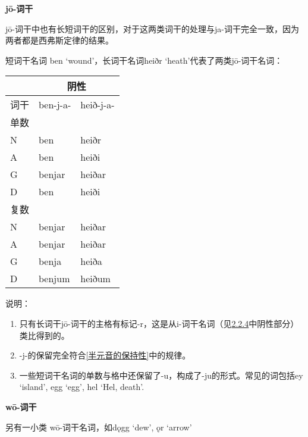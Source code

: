 \textbf{jō-词干}

jō-词干中也有长短词干的区别，对于这两类词干的处理与ja-词干完全一致，因为两者都是西弗斯定律的结果。

短词干名词 ben `wound'，长词干名词heiðr `heath'代表了两类jō-词干名词：

\begin{longtable}{lll}
  \toprule
       & \multicolumn{2}{c}{阴性}             \\
  \midrule
  \endhead
  \bottomrule
  \endfoot
  词干 & ben-j-a-                 & heið-j-a- \\
  单数 &                          &           \\
  N    & ben                      & heiðr     \\
  A    & ben                      & heiði     \\
  G    & benjar                   & heiðar    \\
  D    & ben                      & heiði     \\
  复数 &                          &           \\
  N    & benjar                   & heiðar    \\
  A    & benjar                   & heiðar    \\
  G    & benja                    & heiða     \\
  D    & benjum                   & heiðum    \\
\end{longtable}

说明：

\begin{enumerate}
  \def\labelenumi{\arabic{enumi})}
  \item
        只有长词干jō-词干的主格有标记-r，这是从i-词干名词（见\hyperref[_Ref115770706]{2.2.4}中阴性部分）类比得到的。
  \item
        -j-的保留完全符合\ref{半元音的保持性}中的规律。
  \item
        一些短词干名词的单数与格中还保留了-u，构成了-ju的形式。常见的词包括ey
        `island', egg `egg', hel `Hel, death'.
\end{enumerate}

\textbf{wō-词干}

另有一小类 wō-词干名词，如dǫgg `dew', ǫr `arrow'

